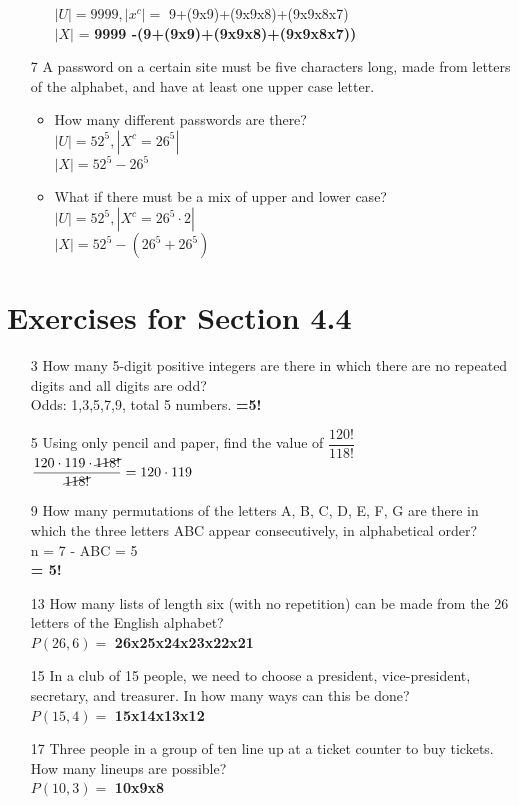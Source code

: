 \documentclass[12pt]{article}
\begin{document}
\begin{enumerate}
\begin{itemize}
		    $|U| = 9999, |x^c| =$ 9+(9x9)+(9x9x8)+(9x9x8x7)\\
		    $|X|$ = \textbf{9999 -(9+(9x9)+(9x9x8)+(9x9x8x7))}
	\end{itemize}
    \item [7] A password on a certain site must be five characters long, made from letters of the alphabet, and have at least one upper case letter.
	\begin{itemize}
	    \item How many different passwords are there?\\
		$|U| = 52^5, |X^c= 26^5|$\\
		$|X| = $\textbf{$52^5 - 26^5$}
	    \item What if there must be a mix of upper and lower case?\\
		$|U| = 52^5, |X^c= 26^5 \cdot 2|$\\
		$|X| = $\textbf{$52^5 - (26^5 + 26^5)$}
	\end{itemize}
\end{enumerate}
\section*{Exercises for Section 4.4}
\begin{enumerate}
    \item [3] How many 5-digit positive integers are there in which there are no repeated
digits and all digits are odd?\\
	Odds: 1,3,5,7,9, total 5 numbers. \textbf{=5!}
    \item [5] Using only pencil and paper, find the value of $\dfrac{120!}{118!}$\\
	$\dfrac{120\cdot 119 \cdot \cancel{118!}}{\cancel{118!}} = 120\cdot 119$
    \item [9] How many permutations of the letters A, B, C, D, E, F, G are there in which the
three letters ABC appear consecutively, in alphabetical order?\\
	n = 7 - ABC = 5\\
	\textbf{= 5!}
    \item [13] How many lists of length six (with no repetition) can be made from the 26 letters
of the English alphabet?\\
	$P(26,6) =$ \textbf{26x25x24x23x22x21}
    \item [15] In a club of 15 people, we need to choose a president, vice-president, secretary,
and treasurer. In how many ways can this be done?\\
	$P(15, 4) =$ \textbf{15x14x13x12}
    \item [17] Three people in a group of ten line up at a ticket counter to buy tickets. How
many lineups are possible?\\
	$P(10, 3) =$ \textbf{10x9x8}
\end{enumerate}
\end{document}
